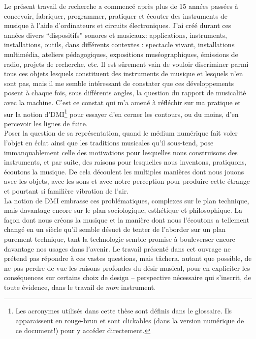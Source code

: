 \indent Le présent travail de recherche a commencé après plus de 15 années passées à concevoir, fabriquer, programmer, pratiquer et écouter des instruments de musique à l'aide d'ordinateurs et circuits électroniques. J'ai créé durant ces années divers ``dispositifs'' sonores et musicaux: applications, instruments, installations, outils, dans différents contextes : spectacle vivant, installations multimédia, ateliers pédagogiques, expositions muséographiques, émissions de radio, projets de recherche, etc. Il est sûrement vain de vouloir discriminer parmi tous ces objets lesquels constituent des instruments de musique et lesquels n'en sont pas, mais il me semble intéressant de constater que ces développements posent à chaque fois, sous différents angles, la question du rapport de musicalité avec la machine. C'est ce constat qui m'a amené à réfléchir sur ma pratique et sur la notion d'\gls{DMI}\footnote{Les acronymes utilisés dans cette thèse sont définis dans le glossaire. Ils apparaissent en \textcolor{glscolor}{rouge-brun} et sont clickables (dans la version numérique de ce document!) pour y accéder directement.} pour essayer d'en cerner les contours, ou du moins, d'en percevoir les lignes de fuite.\\
\indent Poser la question de sa représentation, quand le médium numérique fait voler l’objet en éclat ainsi que les traditions musicales qu’il sous-tend, pose immanquablement celle des motivations pour lesquelles nous construisons des instruments, et par suite, des raisons pour lesquelles nous inventons, pratiquons, écoutons la musique. De cela découlent les multiples manières dont nous jouons avec les objets, avec les sons et avec notre perception pour produire cette étrange et pourtant si familière vibration de l'air.\\
\indent La notion de \gls{DMI} embrasse ces problématiques, complexes sur le plan technique, mais davantage encore sur le plan sociologique, esthétique et philosophique. La façon dont nous créons la musique et la manière dont nous l’écoutons a tellement changé en un siècle qu’il semble désuet de tenter de l’aborder sur un plan purement technique, tant la technologie semble promise à bouleverser encore davantage nos usages dans l’avenir. Le travail présenté dans cet ouvrage ne prétend pas répondre à ces vastes questions, mais tâchera, autant que possible, de ne pas perdre de vue les raisons profondes du désir musical, pour en expliciter les conséquences sur certains choix de design -- perspective nécessaire qui s'inscrit, de toute évidence, dans le travail de \textit{mon} instrument.

